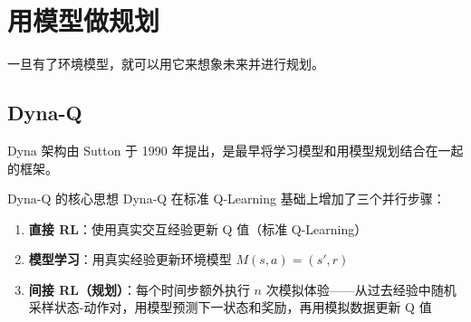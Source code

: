 \section{用模型做规划}

一旦有了环境模型，就可以用它来想象未来并进行规划。

\subsection{Dyna-Q}

Dyna 架构由 Sutton 于 1990 年提出，是最早将学习模型和用模型规划结合在一起的框架。

\begin{mydefinition}{Dyna-Q 的核心思想}
Dyna-Q 在标准 Q-Learning 基础上增加了三个并行步骤：
\begin{enumerate}
    \item \textbf{直接 RL}：使用真实交互经验更新 Q 值（标准 Q-Learning）
    \item \textbf{模型学习}：用真实经验更新环境模型 $M(s, a) = (s', r)$
    \item \textbf{间接 RL（规划）}：每个时间步额外执行 $n$ 次模拟体验——从过去经验中随机采样状态-动作对，用模型预测下一状态和奖励，再用模拟数据更新 Q 值
\end{enumerate}
\end{mydefinition}

